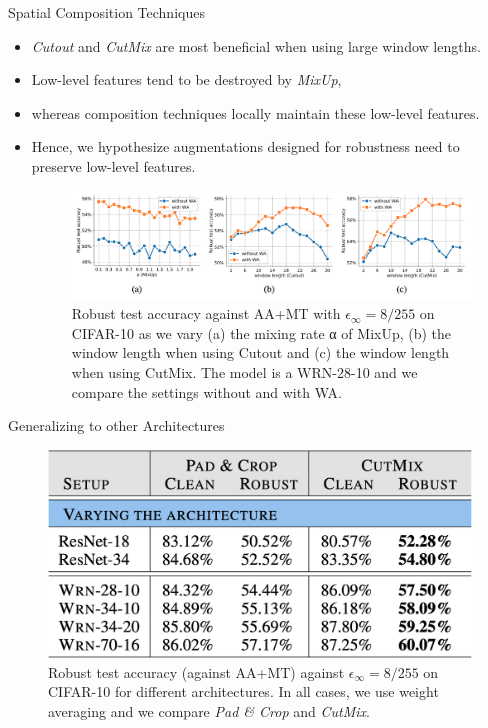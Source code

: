 \begin{frame}{Spatial Composition Techniques}
\begin{itemize}
    \item \textit{Cutout} and \textit{CutMix} are most beneficial when using large window lengths.
    \item Low-level features tend to be destroyed by \textit{MixUp},
    \item whereas composition techniques locally maintain these low-level features. 
    \item Hence, we hypothesize augmentations designed for robustness need to preserve low-level features.
        \begin{figure}
            \centering
            \includegraphics[height=.3\textheight]{pic/data_aug_res.png}
            \caption{Robust test accuracy against AA+MT with $\epsilon_\infty = 8/255$ on CIFAR-10 as we vary (a) the mixing rate α of MixUp, (b) the window length when using Cutout and (c) the window length when using CutMix. The model is a WRN-28-10 and we compare the settings without and with WA. 
            }
            \label{fig:data_aug_res}
        \end{figure}
    \end{itemize}
\end{frame}

\begin{frame}{Generalizing to other Architectures}
    \begin{figure}
        \centering
        \includegraphics[width=\linewidth]{pic/Gen_Arch.png}
            \caption{Robust test accuracy (against AA+MT) against $\epsilon_\infty = 8/255$ on CIFAR-10 for different architectures. In all cases, we use weight averaging and we compare \textit{Pad \& Crop} and \textit{CutMix}.}
        \label{fig:gen_arch}
    \end{figure}
\end{frame}

